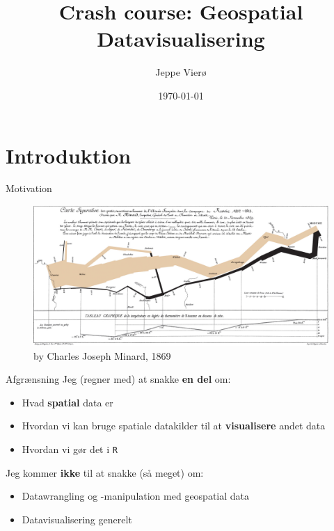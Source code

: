 \documentclass[
  8pt,
  ignorenonframetext,
  aspectratio=169]{beamer}
\title{Crash course: Geospatial Datavisualisering}
\author{Jeppe Vierø}
\date{\today}
\begin{document}
\frame{\titlepage}

\begin{frame}[allowframebreaks]
  \tableofcontents[hideallsubsections]
\end{frame}
\begin{frame}
\tiny

\normalsize
\end{frame}

\hypertarget{introduktion}{%
\section{Introduktion}\label{introduktion}}

\begin{frame}{Motivation}
\protect\hypertarget{motivation}{}
\begin{figure}[H]
    \centering
    \includegraphics[width=.90\textwidth]{pictures/Minard.png}
    \caption{by Charles Joseph Minard, 1869}
\end{figure}
\end{frame}

\begin{frame}[fragile]{Afgrænsning}
\protect\hypertarget{afgruxe6nsning}{}
Jeg (regner med) at snakke \textbf{en del} om:

\begin{itemize}
\item
  Hvad \textbf{spatial} data er
\item
  Hvordan vi kan bruge spatiale datakilder til at \textbf{visualisere}
  andet data
\item
  Hvordan vi gør det i \texttt{R}
\end{itemize}

\bigskip

Jeg kommer \textbf{ikke} til at snakke (så meget) om:

\begin{itemize}
\item
  Datawrangling og -manipulation med geospatial data
\item
  Datavisualisering generelt
\end{itemize}
\end{frame}
\end{document}

